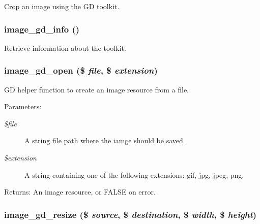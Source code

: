 Crop an image using the GD toolkit. \hypertarget{group__image_g7d5a8bb446703a5cea5524df48af65e1}{
\subsubsection[{image\_\-gd\_\-info}]{\setlength{\rightskip}{0pt plus 5cm}image\_\-gd\_\-info ()}}
\label{group__image_g7d5a8bb446703a5cea5524df48af65e1}


Retrieve information about the toolkit. \hypertarget{group__image_gbb45a7fb30f1066896d524d9b4069622}{
\subsubsection[{image\_\-gd\_\-open}]{\setlength{\rightskip}{0pt plus 5cm}image\_\-gd\_\-open (\$ {\em file}, \/  \$ {\em extension})}}
\label{group__image_gbb45a7fb30f1066896d524d9b4069622}


GD helper function to create an image resource from a file.

\begin{Desc}
\item[Parameters:]
\begin{description}
\item[{\em \$file}]A string file path where the iamge should be saved. \item[{\em \$extension}]A string containing one of the following extensions: gif, jpg, jpeg, png. \end{description}
\end{Desc}
\begin{Desc}
\item[Returns:]An image resource, or FALSE on error. \end{Desc}
\hypertarget{group__image_g0277cb4fc23069a240a2438a97b079ff}{
\subsubsection[{image\_\-gd\_\-resize}]{\setlength{\rightskip}{0pt plus 5cm}image\_\-gd\_\-resize (\$ {\em source}, \/  \$ {\em destination}, \/  \$ {\em width}, \/  \$ {\em height})}}
\label{group__image_g0277cb4fc23069a240a2438a97b079ff}


